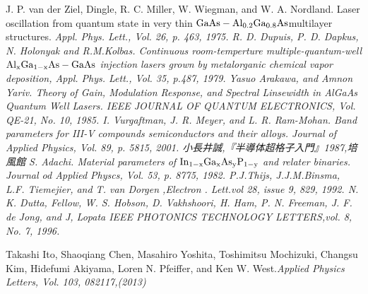 \begin{thebibliography}{99}
 J. P. van der Ziel, Dingle, R. C. Miller, W. Wiegman, and W. A. Nordland. Laser oscillation from quantum state in very thin $\rm{GaAs-Al_{0.2}Ga_{0.8}As }$multilayer structures. \sl Appl. Phys. Lett.\rm , Vol. 26,  p. 463, 1975. 
 R. D. Dupuis, P. D. Dapkus, N. Holonyak and R.M.Kolbas. Continuous room-temperture multiple-quantum-well $\rm{Al_{x}Ga_{1-x}As-GaAs}$ injection lasers grown by metalorganic chemical vapor deposition, \sl  Appl. Phys. Lett.\rm , Vol. 35, p.487, 1979.
 Yasuo Arakawa, and Amnon Yariv. Theory of Gain, Modulation Response, and Spectral Linsewidth in AlGaAs Quantum Well Lasers. \sl IEEE JOURNAL OF QUANTUM ELECTRONICS\rm , Vol. QE-21, No. 10, 1985.
 I. Vurgaftman, J. R. Meyer, and L. R. Ram-Mohan. Band parameters for III-V compounds semiconductors and their alloys. \sl Journal of Applied Physics\rm , Vol. 89, p. 5815, 2001.
小長井誠,『半導体超格子入門』1987,培風館
 S. Adachi. Material parameters of $\rm{In_{1-x}Ga_{x}As_{y}P_{1-y}}$ and relater binaries. \sl Journal od Applied Physcs\rm , Vol. 53, p. 8775, 1982.
 P.J.Thijs, J.J.M.Binsma, L.F. Tiemejier, and T. van Dorgen ,\sl Electron . Lett.\rm vol 28, issue 9, 829, 1992.
N. K. Dutta, Fellow, W. S. Hobson, D. Vakhshoori, H. Ham, P. N. Freeman, J. F. de Jong, and J, Lopata \sl IEEE PHOTONICS TECHNOLOGY LETTERS\rm ,vol. 8, No. 7,  1996.

Takashi Ito, Shaoqiang Chen, Masahiro Yoshita, Toshimitsu Mochizuki, Changsu Kim, Hidefumi Akiyama, Loren N. Pfeiffer, and Ken W. West.\sl Applied Physics Letters\rm, Vol. 103, 082117,(2013)










\end{thebibliography}
